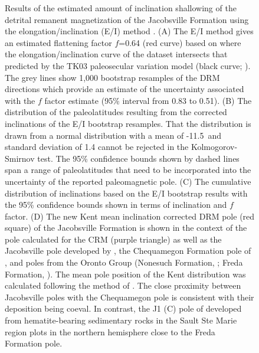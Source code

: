 \documentclass[draft]{agujournal2019}
\begin{document}
\begin{figure}[h!]
\caption{\scriptsize Results of the estimated amount of inclination shallowing of the detrital remanent magnetization of the Jacobsville Formation using the elongation/inclination (E/I) method \cite{Tauxe2004b}. (A) The E/I method gives an estimated flattening factor $f$=0.64 (red curve) based on where the elongation/inclination curve of the dataset intersects that predicted by the TK03 paleosecular variation model (black curve; ). The grey lines show 1,000 bootstrap resamples of the DRM directions which provide an estimate of the uncertainty associated with the $f$ factor estimate (95\% interval from 0.83 to 0.51). (B) The distribution of the paleolatitudes resulting from the corrected inclinations of the E/I bootstrap resamples. That the distribution is drawn from a normal distribution with a mean of -11.5\textdegree\ and standard deviation of 1.4 cannot be rejected in the Kolmogorov-Smirnov test. The 95\% confidence bounds shown by dashed lines span a range of paleolatitudes that need to be incorporated into the uncertainty of the reported paleomagnetic pole. (C) The cumulative distribution of inclinations based on the E/I bootstrap results with the 95\% confidence bounds shown in terms of inclination and $f$ factor. (D) The new Kent mean inclination corrected DRM pole (red square) of the Jacobsville Formation is shown in the context of the pole calculated for the CRM (purple triangle) as well as the Jacobsville pole developed by , the Chequamegon Formation pole of , and poles from the Oronto Group (Nonesuch Formation, ; Freda Formation, ). The mean pole position of the Kent distribution was calculated following the method of . The close proximity between Jacobsville poles with the Chequamegon pole is consistent with their deposition being coeval. In contrast, the J1 (C) pole of  developed from hematite-bearing sedimentary rocks in the Sault Ste Marie region plots in the northern hemisphere close to the Freda Formation pole. }
\label{fig:EI_results}
\end{figure}
\end{document}
